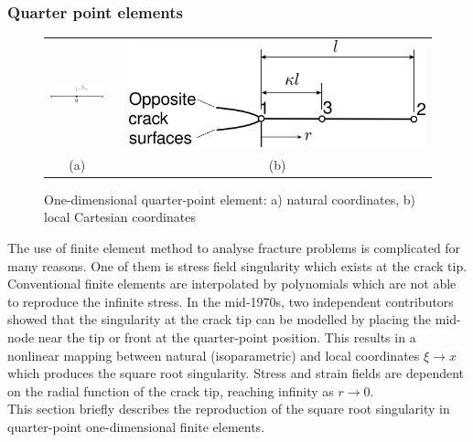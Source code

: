 \documentclass[11pt]{acmeArticle}
\numberwithin{equation}{section}
\begin{document}
\subsubsection{Quarter point elements} %
\begin{figure}[h!]
\begin{center}
\begin{tabular}{c c c}
\includegraphics[height=1.3cm]{Figures/StandardElement.pdf} &   & \includegraphics[height=2.cm]{Figures/QuarterPoint.pdf}  \\  
 (a) & & (b)
\end{tabular}
\caption{One-dimensional quarter-point element: a) natural coordinates, b) local Cartesian coordinates}
\label{fig:1d-quarter}
\end{center}
\end{figure}
The use of finite element method to analyse fracture problems is complicated for many reasons. 
One of them is stress field singularity which exists at the crack tip.
Conventional finite elements are interpolated by polynomials which are not able to reproduce the infinite stress. 
In the mid-1970s, two independent contributors \citep{barsoum1976use,henshell1975crack} showed that the singularity at the crack tip can be modelled by placing the mid-node near the tip or front at the quarter-point position. 
This results in a nonlinear mapping between natural (isoparametric) and local coordinates $\xi \rightarrow x$ which produces the square root singularity. 
Stress and strain fields are dependent on the radial function of the crack tip, reaching infinity as $ r \rightarrow 0$. \\
This section briefly describes the reproduction of the square root singularity in quarter-point one-dimensional finite elements. 
\end{document}
